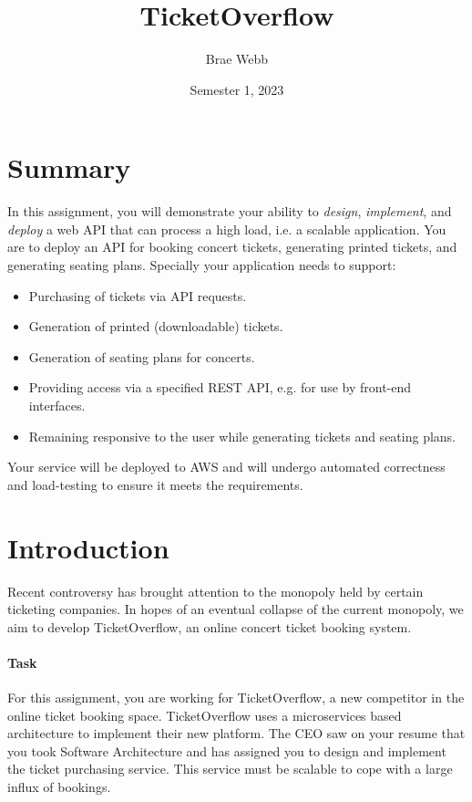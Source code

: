 \documentclass{csse4400}
\title{TicketOverflow}
\author{Brae Webb}
\date{Semester 1, 2023}
\begin{document}
\maketitle

\section*{Summary}
In this assignment, you will demonstrate your ability to \textsl{design},
\textsl{implement}, and \textsl{deploy} a web API that can process a high load,
i.e. a scalable application.
You are to deploy an API for booking concert tickets,
generating printed tickets, and generating seating plans.
Specially your application needs to support:
\begin{itemize}
    \item Purchasing of tickets via API requests.
    \item Generation of printed (downloadable) tickets.
    \item Generation of seating plans for concerts.
    \item Providing access via a specified REST API, e.g. for use by front-end interfaces.
    \item Remaining responsive to the user while generating tickets and seating plans.
\end{itemize}

Your service will be deployed to AWS and will undergo automated correctness and load-testing to ensure it meets the requirements.

\section{Introduction}
Recent controversy has brought attention to the monopoly held by certain ticketing companies.
In hopes of an eventual collapse of the current monopoly,
we aim to develop TicketOverflow,
an online concert ticket booking system.

\paragraph{Task}
For this assignment,
you are working for TicketOverflow,
a new competitor in the online ticket booking space.
TicketOverflow uses a microservices based architecture to implement their new platform.
The CEO saw on your resume that you took Software Architecture and has assigned you to design and implement the ticket purchasing service.
This service must be scalable to cope with a large influx of bookings.
\end{document}
